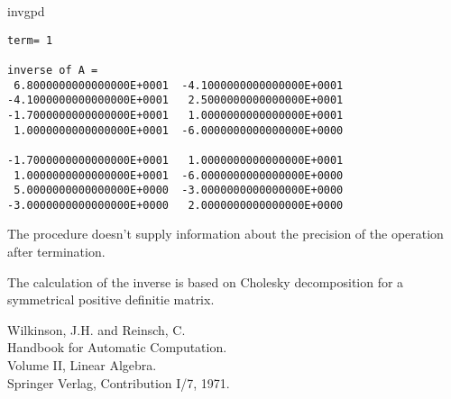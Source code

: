 \documentclass{report}
\newcommand{\References}{\item[References]\rmfamily}
\newcommand{\Method}{\item[Method]\rmfamily}
\newcommand{\Precision}{\item[Precision]\rmfamily}
\begin{document}
\begin{procedure}{invgpd}
\begin{verbatim}
term= 1

inverse of A =
 6.8000000000000000E+0001  -4.1000000000000000E+0001
-4.1000000000000000E+0001   2.5000000000000000E+0001
-1.7000000000000000E+0001   1.0000000000000000E+0001
 1.0000000000000000E+0001  -6.0000000000000000E+0000

-1.7000000000000000E+0001   1.0000000000000000E+0001
 1.0000000000000000E+0001  -6.0000000000000000E+0000
 5.0000000000000000E+0000  -3.0000000000000000E+0000
-3.0000000000000000E+0000   2.0000000000000000E+0000
\end{verbatim}

\Precision

The procedure doesn't supply information about the precision of the
operation after termination.

\Method

The calculation of the inverse is based on Cholesky decomposition for a
symmetrical positive definitie matrix. 

\References

 Wilkinson, J.H. and Reinsch, C.\\ Handbook for Automatic Computation.\\
 Volume II, Linear Algebra.\\ Springer Verlag, Contribution I/7, 1971.

\end{procedure}
\end{document}
